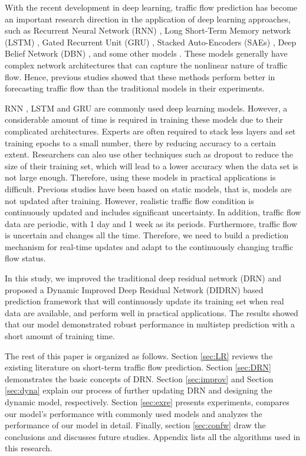 \documentclass[twocolumn]{article}
\begin{document}
  With the recent development in deep learning, traffic flow prediction has become an important research direction in the application of deep learning approaches, such as Recurrent Neural Network (RNN) \citep{RNN}, Long Short-Term Memory network (LSTM) \citep{LSTMtraffic}, Gated Recurrent Unit (GRU) \citep{gruTraffic}, Stacked Auto-Encoders (SAEs) \citep{SAE}, Deep Belief Network (DBN) \citep{huang2014deep}, and some other models \citep{vlahogianni2008temporal,stathopoulos2008fuzzy,ghosh2010random,tan2018dynamic,songmatch}. These models generally have complex network architectures that can capture the nonlinear nature of traffic flow. Hence, previous studies showed that these methods perform better in forecasting traffic flow than the traditional models in their experiments\citep{gruTraffic,LSTMtraffic,SAE,huang2014deep,RNN}. 
\par
RNN \citep{RNN}, LSTM \citep{LSTMtraffic} and GRU \citep{gruTraffic} are commonly used deep learning models. However, a considerable amount of time is required in training these models due to their complicated architectures. Experts are often required to stack less layers and set training epochs to a small number, there by reducing accuracy to a certain extent. Researchers can also use other techniques such as dropout to reduce the size of their training set, which will lead to a lower accuracy when the data set is not large enough. Therefore, using these models in practical applications is difficult. Previous studies have been based on static models, that is, models are not updated after training. However, realistic traffic flow condition is continuously updated and includes significant uncertainty. 
In addition, traffic flow data are periodic, with 1 day and 1 week as its periods\citep{tan2013tensor,tan2016comparison,wu2017robust}.
Furthermore, traffic flow is uncertain and changes all the time\citep{chen2018novel}. Therefore, we need to build a prediction mechanism for real-time updates and adapt to the continuously changing traffic flow status.
\par
In this study, we improved the traditional deep residual network (DRN)\citep{DRN} and proposed a Dynamic Improved Deep Residual Network (DIDRN) based prediction framework that will continuously update its training set when real data are available, and perform well in practical applications. The results showed that our model demonstrated robust performance in multistep prediction with a short amount of training time.
\par
The rest of this paper is organized as follows. Section  \ref{sec:LR} reviews the existing literature on short-term traffic flow prediction. Section \ref{sec:DRN} demonstrates the basic concepts of DRN. Section \ref{sec:improv} and Section \ref{sec:dyna} explain our process of further updating DRN and designing the dynamic model, respectively. Section \ref{sec:exre} presents experiments, compares our model's performance with commonly used models and analyzes the performance of our model in detail. Finally, section \ref{sec:confw} draw the conclusions and discusses future studies. Appendix lists all the algorithms used in this research.
\end{document}
